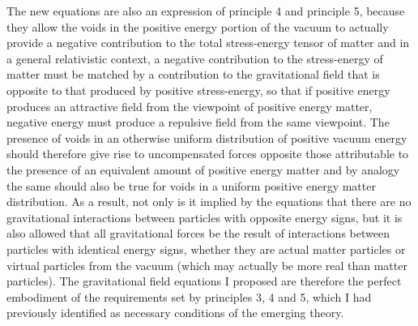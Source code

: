 \documentclass[notitlepage,12pt]{report}
\begin{document}
The new equations are also an expression of principle 4 and principle 5, because they allow the voids in the positive energy portion of the vacuum to actually provide a negative contribution to the total stress-energy tensor of matter and in a general relativistic context, a negative contribution to the stress-energy of matter must be matched by a contribution to the gravitational field that is opposite to that produced by positive stress-energy, so that if positive energy produces an attractive field from the viewpoint of positive energy matter, negative energy must produce a repulsive field from the same viewpoint. The presence of voids in an otherwise uniform distribution of positive vacuum energy should therefore give rise to uncompensated forces opposite those attributable to the presence of an equivalent amount of positive energy matter and by analogy the same should also be true for voids in a uniform positive energy matter distribution. As a result, not only is it implied by the equations that there are no gravitational interactions between particles with opposite energy signs, but it is also allowed that all gravitational forces be the result of interactions between particles with identical energy signs, whether they are actual matter particles or virtual particles from the vacuum (which may actually be more real than matter particles). The gravitational field equations I proposed are therefore the perfect embodiment of the requirements set by principles 3, 4 and 5, which I had previously identified as necessary conditions of the emerging theory.
\end{document}
